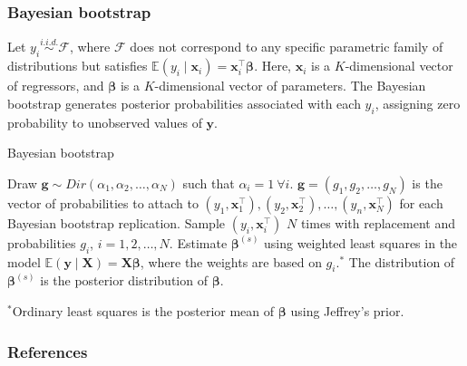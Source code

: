 \documentclass[12pt, compress]{beamer}
\begin{document}
\begin{frame}
	\frametitle{Bayesian bootstrap}
Let $y_i \stackrel{i.i.d.}{\sim} \mathcal{F}$, where $\mathcal{F}$ does not correspond to any specific parametric family of distributions but satisfies $\mathbb{E}(y_i \mid \bm{x}_i) = \bm{x}_i^{\top}\bm{\beta}$. Here, $\bm{x}_i$ is a $K$-dimensional vector of regressors, and $\bm{\beta}$ is a $K$-dimensional vector of parameters. The Bayesian bootstrap generates posterior probabilities associated with each $y_i$, assigning zero probability to unobserved values of $\bm{y}$.
\end{frame}

\begin{frame}{Bayesian bootstrap}
	\begin{algorithm}[H]
		\caption{Bayesian bootstrap}\label{Alg:BB}
		\begin{algorithmic}[1]
			\State Draw $\bm{g}\sim Dir(\alpha_1,\alpha_2,\dots,\alpha_N)$ such that $\alpha_i=1 \ \forall i$.
		\State $\bm{g}=(g_1,g_2,\dots,g_N)$ is the vector of probabilities to attach to $(y_1,\bm{x}_1^{\top}),(y_2,\bm{x}_2^{\top}),\dots,(y_n,\bm{x}_N^{\top})$ for each Bayesian bootstrap replication.
			\State Sample $(y_i,\bm{x}_i^{\top})$ $N$ times with replacement and probabilities $g_i$, $i=1,2,\dots,N$.
			\State Estimate $\bm{\beta}^{(s)}$ using weighted least squares in the model $\mathbb{E}(\bm{y}\mid \bm{X})=\bm{X}\bm{\beta}$, where the weights are based on $g_i$.$^*$ 
		\EndFor
		\State The distribution of $\bm{\beta}^{(s)}$ is the posterior distribution of $\bm{\beta}$. 
		\end{algorithmic}
        $^*${\footnotesize{Ordinary least squares is the posterior mean of $\bm{\beta}$ using Jeffrey's prior.}}
	\end{algorithm}
\end{frame}


\begin{frame}[allowframebreaks]
	\frametitle{References}
		{\footnotesize
		
		}
\end{frame}
	
\end{document}
